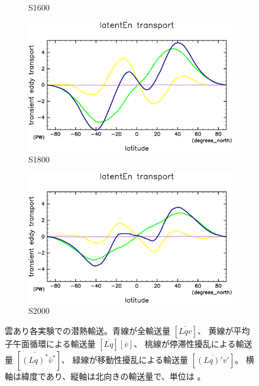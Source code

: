 \documentclass[body]{subfiles}
\begin{document}
\begin{figure}[t]
\begin{subfigure}{.4\textwidth}
		\caption{S1600}\label{潜熱S1600}
	\end{subfigure}
	\begin{subfigure}{.4\textwidth}
		\centering
		\includegraphics[width=\textwidth]{S1800/MeriHeatTrans@latentEn,time=3650:4015-crop-rotate.pdf}
		\caption{S1800}\label{潜熱S1800}
	\end{subfigure}
	\begin{subfigure}{.4\textwidth}
		\centering
		\includegraphics[width=\textwidth]{S2000/MeriHeatTrans@latentEn,time=7300:7665-crop-rotate.pdf}
		\caption{S2000}\label{潜熱S2000}
	\end{subfigure}
	\caption[雲あり各実験での潜熱輸送の内訳]{
		雲あり各実験での潜熱輸送。青線が全輸送量 \([\overline{Lqv}]\)、
		黄線が平均子午面循環による輸送量 \([\overline{Lq}][\overline{v}]\)、
		桃線が停滞性擾乱による輸送量 \([\overline{(Lq)^*}\bar v^*]\)、
		緑線が移動性擾乱による輸送量 \([\overline{(Lq)'v'}]\)。
		横軸は緯度であり、縦軸は北向きの輸送量で、単位は 。
	}\label{潜熱}
\end{figure}
\end{document}
